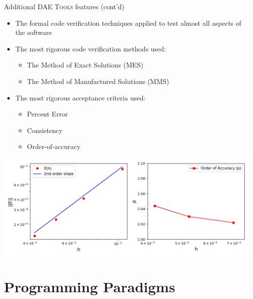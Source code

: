 \documentclass[compress,newPxFont,sthlmFooter]{beamer}
\begin{document}
\begin{frame}{Additional \textsc{DAE Tools} features (cont'd)}
  \begin{itemize}
      \item The \alert{formal code verification techniques} applied to test almost all aspects of the software
      \item The \alert{most rigorous code verification methods} used:
        \begin{itemize}
          \item The \alert{Method of Exact Solutions} (MES) 
          \item The \alert{Method of Manufactured Solutions} (MMS)
        \end{itemize}
      \item The \alert{most rigorous acceptance criteria} used:
        \begin{itemize}
          \item Percent Error
          \item Consistency
          \item \alert{Order-of-accuracy}
        \end{itemize}
  \end{itemize}
  \begin{center}
      \includegraphics[align=c, height=0.27\paperheight]{code_verification.png}
  \end{center}
\end{frame}

\section{Programming Paradigms}
\end{document}
